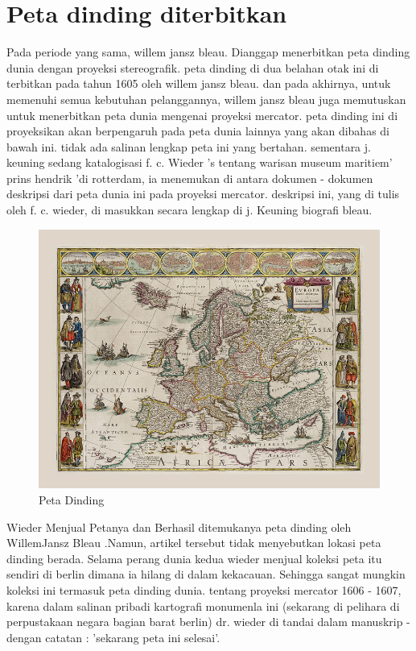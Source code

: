 \section{Peta dinding diterbitkan}
Pada periode yang sama, willem jansz bleau. Dianggap menerbitkan peta dinding dunia dengan proyeksi stereografik. 
peta dinding di dua belahan otak ini di terbitkan pada tahun 1605 oleh willem jansz bleau. dan pada akhirnya, untuk memenuhi semua kebutuhan pelanggannya, willem jansz bleau juga memutuskan untuk menerbitkan peta dunia mengenai proyeksi mercator. 
peta dinding ini di proyeksikan akan berpengaruh pada peta dunia lainnya yang akan dibahas di bawah ini. tidak ada salinan lengkap peta ini yang bertahan. sementara j. keuning sedang katalogisasi f. c. Wieder 's tentang warisan museum maritiem' 
prins hendrik 'di rotterdam, ia menemukan di antara dokumen - dokumen deskripsi dari peta dunia ini pada proyeksi mercator. 
deskripsi ini, yang di tulis oleh f. c. wieder, di masukkan secara lengkap di j. Keuning biografi bleau. 



\begin{figure}[ht]

\centerline{\includegraphics[width=1\textwidth]{figures/petadinding.jpg}}

\caption{Peta Dinding}

\label{petadinding}

\end{figure}


 
Wieder Menjual Petanya dan Berhasil ditemukanya peta dinding oleh WillemJansz Bleau .Namun, artikel tersebut tidak menyebutkan lokasi peta dinding berada. 
Selama perang dunia kedua wieder menjual koleksi peta itu sendiri di berlin dimana ia hilang di dalam kekacauan. 
Sehingga sangat mungkin koleksi ini termasuk peta dinding dunia. tentang proyeksi mercator 1606 - 1607, 
karena dalam salinan pribadi kartografi monumenla ini (sekarang di pelihara di perpustakaan negara bagian barat berlin) 
dr. wieder di tandai dalam manuskrip - dengan catatan : 'sekarang peta ini selesai'. 


